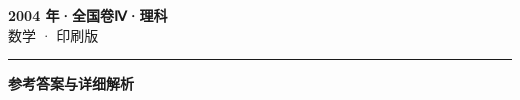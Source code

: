 \documentclass[zihao=5, a4paper]{ctexart}
\begin{document}
\begin{center}
  {\Large\bfseries 2004 年·全国卷Ⅳ·理科}\\[4pt]
  {\large 数学 · 印刷版}
\end{center}
\medskip
{}

\par\bigskip\hrule\bigskip
{}
\begin{center}{\large\bfseries 参考答案与详细解析}\end{center}
\smallskip

\end{document}
